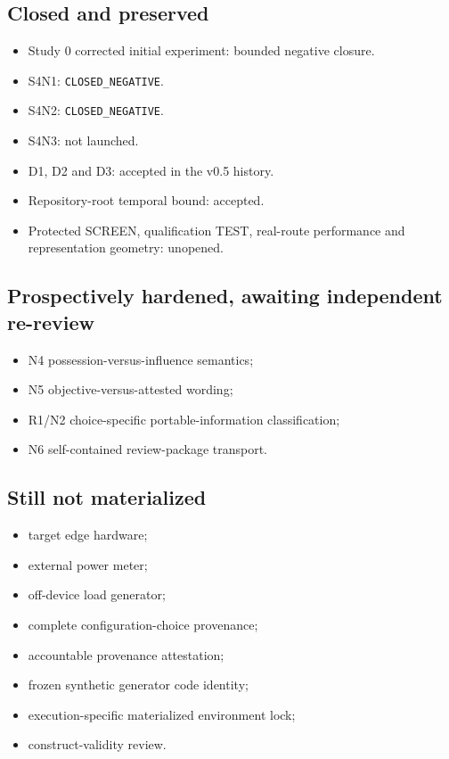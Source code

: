 \documentclass[10pt,a4paper]{article}
\newcommand{\code}[1]{\texttt{#1}}
\begin{document}
\subsection*{Closed and preserved}

\begin{itemize}
\item Study 0 corrected initial experiment: bounded negative closure.
\item S4N1: \code{CLOSED\_NEGATIVE}.
\item S4N2: \code{CLOSED\_NEGATIVE}.
\item S4N3: not launched.
\item D1, D2 and D3: accepted in the v0.5 history.
\item Repository-root temporal bound: accepted.
\item Protected SCREEN, qualification TEST, real-route performance and representation geometry: unopened.
\end{itemize}

\subsection*{Prospectively hardened, awaiting independent re-review}

\begin{itemize}
\item N4 possession-versus-influence semantics;
\item N5 objective-versus-attested wording;
\item R1/N2 choice-specific portable-information classification;
\item N6 self-contained review-package transport.
\end{itemize}

\subsection*{Still not materialized}

\begin{itemize}
\item target edge hardware;
\item external power meter;
\item off-device load generator;
\item complete configuration-choice provenance;
\item accountable provenance attestation;
\item frozen synthetic generator code identity;
\item execution-specific materialized environment lock;
\item construct-validity review.
\end{itemize}
\end{document}
